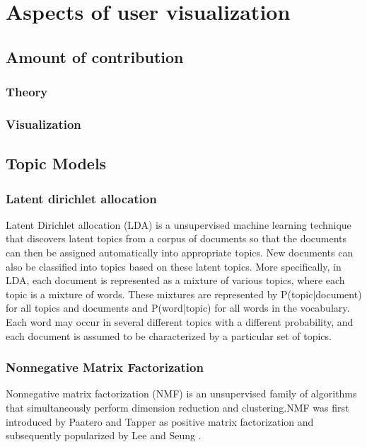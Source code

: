 \section{Aspects of user visualization}

\subsection{Amount of contribution}
\subsubsection{Theory}
\subsubsection{Visualization}

\subsection{Topic Models}
\subsubsection{Latent dirichlet allocation}

Latent Dirichlet allocation (LDA) \cite{Blei:2003:LDA:944919.944937, heinrich2005parameter, steyvers} is a unsupervised machine learning technique 
that discovers latent topics from a corpus of documents so that the documents 
can then be assigned automatically into appropriate topics. New documents can 
also be classified into topics based on these latent topics. 
More specifically, in LDA, each document is represented as a mixture of various
topics, where each topic is a mixture of words. These mixtures are represented
by P(topic|document) for all topics and documents and P(word|topic) for all words 
in the vocabulary. Each word may occur in several different topics with a different probability, and each document is assumed to be characterized by a particular set of topics.


\subsubsection{Nonnegative Matrix Factorization}

Nonnegative matrix factorization (NMF) is an unsupervised family of algorithms that simultaneously perform dimension reduction and clustering.NMF was first introduced
by Paatero and Tapper \cite{paa94} as positive matrix factorization and subsequently
popularized by Lee and Seung \cite{lee99}.


